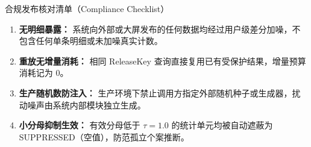 \begin{techbox}{合规发布核对清单（Compliance Checklist）}
\begin{enumerate}[leftmargin=1.5em, itemsep=2pt]
  \item \textbf{无明细暴露：} 系统向外部或大屏发布的任何数据均经过用户级差分加噪，不包含任何单条明细或未加噪真实计数。
  \item \textbf{重放无增量消耗：} 相同 ReleaseKey 查询直接复用已有受保护结果，增量预算消耗记为 0。
  \item \textbf{生产随机数防注入：} 生产环境下禁止调用方指定外部随机种子或生成器，扰动噪声由系统内部模块独立生成。
  \item \textbf{小分母抑制生效：} 有效分母低于 $\tau=1.0$ 的统计单元均被自动遮蔽为 SUPPRESSED（空值），防范孤立个案推断。
\end{enumerate}
\end{techbox}
